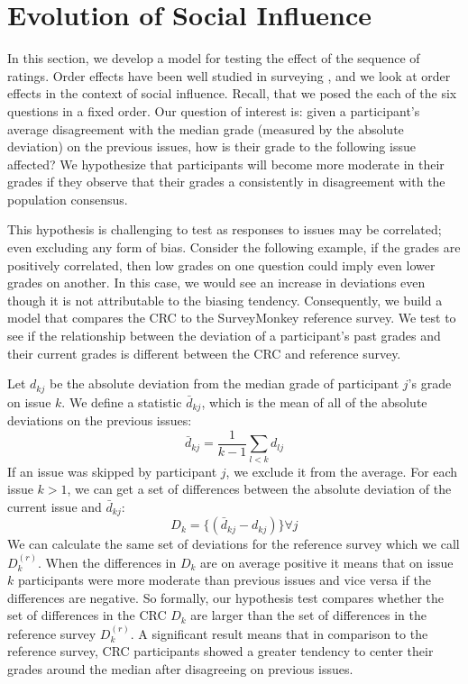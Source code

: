 \section{Evolution of Social Influence}
\label{path}
In this section, we develop a model for testing the effect of the sequence of ratings.
Order effects have been well studied in surveying \cite{krosnick1987evaluation}, and we look at order effects in the context of social influence. 
Recall, that we posed the each of the six questions in a fixed order.
Our question of interest is: given a participant's average disagreement with the median grade (measured by the absolute deviation) on the previous issues, how is their grade to the following issue affected?
We hypothesize that participants will become more moderate in their grades if they observe that their grades a consistently in disagreement with the population consensus.

This hypothesis is challenging to test as responses to issues may be correlated; even excluding any form of bias.
Consider the following example, if the grades are positively correlated, then low grades on one question could imply even lower grades on another.
In this case, we would see an increase in deviations even though it is not attributable to the biasing tendency.
Consequently, we build a model that compares the CRC to the SurveyMonkey reference survey.
We test to see if the relationship between the deviation of a participant's past grades and their current grades is different between the CRC and reference survey.

Let $d_{kj}$ be the absolute deviation from the median grade of participant $j$'s grade on issue $k$. 
We define a statistic $\bar{d}_{kj}$, which is the mean of all of the absolute deviations on the previous issues:
\begin{equation}
\bar{d}_{kj} = \frac{1}{k-1} \sum_{l < k}  d_{lj}
\end{equation}
If an issue was skipped by participant $j$, we exclude it from the average.
For each issue $k > 1$, we can get a set of differences between the absolute deviation of the current issue and $\bar{d}_{kj}$:
\begin{equation}
D_k = \{(\bar{d}_{kj}-d_{kj})\} \forall j
\end{equation}
We can calculate the same set of deviations for the reference survey which we call $D_k^{(r)}$.
When the differences in $D_k$ are on average positive it means that on issue $k$ participants were more moderate than previous issues and vice versa if the differences are negative.
So formally, our hypothesis test compares whether the set of differences in the CRC $D_k$ are larger than the set of differences in the reference survey $D_k^{(r)}$.
A significant result means that in comparison to the reference survey, CRC participants showed a greater tendency to center their grades around the median after disagreeing on previous issues.

